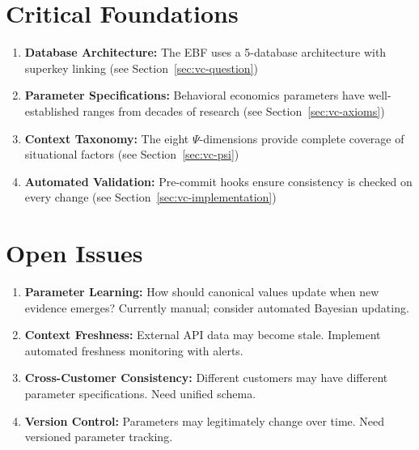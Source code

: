 \section{Critical Foundations}
\label{sec:vc-foundations}

\begin{enumerate}
    \item \textbf{Database Architecture:} The EBF uses a 5-database architecture with superkey linking (see Section~\ref{sec:vc-question})

    \item \textbf{Parameter Specifications:} Behavioral economics parameters have well-established ranges from decades of research (see Section~\ref{sec:vc-axioms})

    \item \textbf{Context Taxonomy:} The eight $\Psi$-dimensions provide complete coverage of situational factors (see Section~\ref{sec:vc-psi})

    \item \textbf{Automated Validation:} Pre-commit hooks ensure consistency is checked on every change (see Section~\ref{sec:vc-implementation})
\end{enumerate}

\section{Open Issues}
\label{sec:vc-open}

\begin{enumerate}
    \item \textbf{Parameter Learning:} How should canonical values update when new evidence emerges? Currently manual; consider automated Bayesian updating.

    \item \textbf{Context Freshness:} External API data may become stale. Implement automated freshness monitoring with alerts.

    \item \textbf{Cross-Customer Consistency:} Different customers may have different parameter specifications. Need unified schema.

    \item \textbf{Version Control:} Parameters may legitimately change over time. Need versioned parameter tracking.
\end{enumerate}

